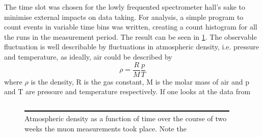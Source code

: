   The time slot was chosen for the lowly frequented spectrometer hall's sake to minimise external impacts on data taking. For analysis, a simple program to count events in variable time bins was written, creating a count histogram for all the runs in the measurement period. The result can be seen in \ref{fig:moduleStability}. The observable fluctuation is well describable by fluctuations in atmospheric density, i.e. pressure and temperature, as ideally, air could be described by
  \begin{equation}
  	\rho = \frac{R}{M}\frac{p}{T}
  \end{equation}
  where $\rho$ is the density, R is the gas constant, M is the molar mass of air and p and T are pressure and temperature respectively.
  If one looks at the data from 
  \begin{figure}
	\centering
  	\includegraphics[width = 0.9 \textwidth]{graphics/dummy.eps}
  	\caption{Atmospheric density as a function of time over the course of two weeks the muon measurements took place. Note the }
  	\label{fig:moduleStability}
  \end{figure}

